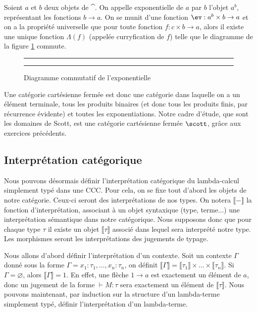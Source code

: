 \begin{defi}[Exponentiation]
    Soient $a$ et $b$ deux objets de $\cat$. On appelle exponentielle de $a$ par $b$ l'objet $a^b$, représentant les fonctions $b\to a$. On se munit d'une fonction $\ev : a^b\times b \to a$ et on a la propriété universelle que pour toute fonction $f : c\times b \to a$, alors il existe une unique fonction $\Lambda(f)$ (appelée curryfication de $f$) telle que le diagramme de la figure \ref{expo} commute.
    \begin{figure}[t]
        \centering
        \rule{17cm}{0.5pt}
        \rule{17cm}{0.5pt}
        \caption{Diagramme commutatif de l'exponentielle}
        \label{expo}
    \end{figure}
\end{defi}

Une catégorie cartésienne fermée est donc une catégorie dans laquelle on a un élément terminale, tous les produits binaires (et donc tous les produits finis, par récurrence évidente) et toutes les exponentiations. Notre cadre d'étude, que sont les domaines de Scott, est une catégorie cartésienne fermée $\scott$, grâce aux exercices précédents.

\subsection{Interprétation catégorique}

Nous pouvons désormais définir l'interprétation catégorique du lambda-calcul simplement typé dans une CCC. Pour cela, on se fixe tout d'abord les objets de notre catégorie. Ceux-ci seront des interprétations de nos types. On notera $\llbracket -\rrbracket$ la fonction d'interprétation, associant à un objet syntaxique (type, terme...) une interprétation sémantique dans notre catégorique. Nous supposons donc que pour chaque type $\tau$ il existe un objet $\llbracket\tau\rrbracket$ associé dans lequel sera interprété notre type. Les morphismes seront les interprétations des jugements de typage.

Nous allons d'abord définir l'interprétation d'un contexte. Soit un contexte $\Gamma$ donné sous la forme $\Gamma = x_1 : \tau_1,\ldots , x_n : \tau_n$, on définit $\llbracket\Gamma\rrbracket=\llbracket\tau_1\rrbracket\times\ldots\times\llbracket\tau_n\rrbracket$. Si $\Gamma = \varnothing$, alors $\llbracket\Gamma\rrbracket=1$. En effet, une flèche $1\to a$ est exactement un élément de $a$, donc un jugement de la forme $\vdash M : \tau$ sera exactement un élément de $\llbracket\tau\rrbracket$. Nous pouvons maintenant, par induction sur la structure d'un lambda-terme simplement typé, définir l'interprétation d'un lambda-terme.

